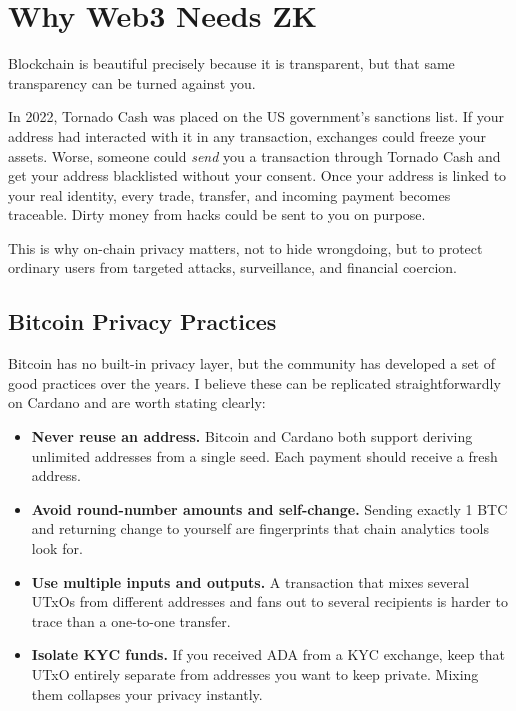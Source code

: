 \section{Why Web3 Needs ZK} \label{sec:web3-needs-zk}

Blockchain is beautiful precisely because it is transparent, but that same transparency can be turned against you.

In 2022, Tornado Cash was placed on the US government's sanctions list. If your address had interacted with it in any transaction, exchanges could freeze your assets. Worse, someone could \emph{send} you a transaction through Tornado Cash and get your address blacklisted without your consent. Once your address is linked to your real identity, every trade, transfer, and incoming payment becomes traceable. Dirty money from hacks could be sent to you on purpose.

This is why on-chain privacy matters, not to hide wrongdoing, but to protect ordinary users from targeted attacks, surveillance, and financial coercion.

\subsection*{Bitcoin Privacy Practices}

Bitcoin has no built-in privacy layer, but the community has developed a set of good practices over the years. I believe these can be replicated straightforwardly on Cardano and are worth stating clearly:

\begin{itemize}
  \item \textbf{Never reuse an address.} Bitcoin and Cardano both support deriving unlimited addresses from a single seed. Each payment should receive a fresh address.
  \item \textbf{Avoid round-number amounts and self-change.} Sending exactly 1 BTC and returning change to yourself are fingerprints that chain analytics tools look for.
  \item \textbf{Use multiple inputs and outputs.} A transaction that mixes several UTxOs from different addresses and fans out to several recipients is harder to trace than a one-to-one transfer.
  \item \textbf{Isolate KYC funds.} If you received ADA from a KYC exchange, keep that UTxO entirely separate from addresses you want to keep private. Mixing them collapses your privacy instantly.
\end{itemize}

